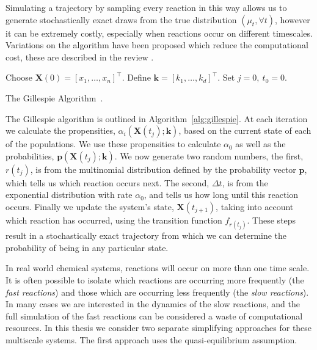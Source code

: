 \documentclass[final]{siamltex}
\begin{document}
Simulating a trajectory by sampling every reaction in this way allows us to generate stochastically exact draws from the true distribution $(\mu_t, \forall t)$, however it can be extremely costly, especially when reactions occur on different timescales. Variations on the algorithm have been proposed which reduce the computational cost, these are described in the review \cite{gillespie2007stochastic}.

\begin{table}[!htpb]
\centering
\begin{algorithm}[H]
\DontPrintSemicolon
\BlankLine
	Choose $\mathbf{X}(0) = [x_1, \ldots, x_n]^\top$.\;
	Define $\mathbf{k} = [k_1, \ldots, k_d]^\top$.\;
	Set $j= 0,\ t_0 = 0$.\;
\caption{The Gillespie Algorithm~\cite{gillespie2007stochastic}.\label{alg:gillespie}}
\end{algorithm}
\end{table}

The Gillespie algorithm is outlined in Algorithm~\ref{alg:gillespie}. At each iteration we calculate the propensities, $\alpha_i(\mathbf{X}(t_j);\mathbf{k})$, based on the current state of each of the populations. We use these propensities to calculate $\alpha_0$ as well as the probabilities, $\mathbf{p}(\mathbf{X}(t_j); \mathbf{k})$. We now generate two random numbers, the first, $r(t_j)$, is from the multinomial distribution defined by the probability vector $\mathbf{p}$, which tells us which reaction occurs next. The second, $\Delta t$, is from the exponential distribution with rate $\alpha_0$, and tells us how long until this reaction occurs. Finally we update the system's state, $\mathbf{X}(t_{j+1})$, taking into account which reaction has occurred, using the transition function $f_{r(t_j)}$. These steps result in a stochastically exact trajectory from which we can determine the probability of being in any particular state.


In real world chemical systems, reactions will occur on more than one time scale. It is often possible to isolate which reactions are occurring more frequently (the \textit{fast reactions}) and those which are occurring less frequently (the \textit{slow reactions}). In many cases we are interested in the dynamics of the slow reactions, and the full simulation of the fast reactions can be considered a waste of computational resources. In this thesis we consider two separate simplifying approaches for these multiscale systems. The first approach uses the quasi-equilibrium assumption.
\end{document}

